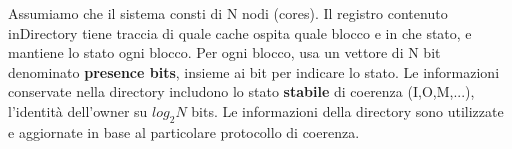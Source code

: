 \begin{figure}[ht]
    \centering
    \setlength{\fboxrule}{0.5pt} %
    \setlength{\fboxsep}{0pt}    %
\end{figure}

Assumiamo che il sistema consti di N nodi (cores). Il registro contenuto inDirectory tiene traccia di quale cache ospita quale blocco e in che stato, e mantiene lo stato ogni blocco. Per ogni blocco, usa un vettore di N bit denominato \textbf{presence bits}, insieme ai bit per indicare lo stato. Le informazioni conservate nella directory includono lo stato \textbf{stabile} di coerenza (I,O,M,...), l'identità dell'owner su $log_2N$ bits. Le informazioni della directory sono utilizzate e aggiornate in base al particolare protocollo di coerenza. 